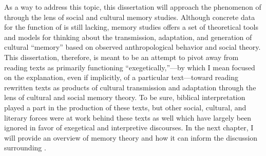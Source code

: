 As a way to address this topic, this dissertation will approach the phenomenon of \rwb through the lens of social and cultural memory studies. Although concrete data for the function of \rwb is still lacking, memory studies offers a set of theoretical tools and models for thinking about the transmission, adaptation, and generation of cultural ``memory'' based on observed anthropological behavior and social theory. This dissertation, therefore, is meant to be an attempt to pivot away from reading \rwb texts as primarily functioning ``exegetically,''---by which I mean focused on the explanation, even if implicitly, of a particular text---toward reading rewritten texts as products of cultural transmission and adaptation through the lens of cultural and social memory theory. To be sure, biblical interpretation played a part in the production of these texts, but other social, cultural, and literary forces were at work behind these texts as well which have largely been ignored in favor of exegetical and interpretive discourses. In the next chapter, I will provide an overview of memory theory and how it can inform the discussion surrounding \rwb.

